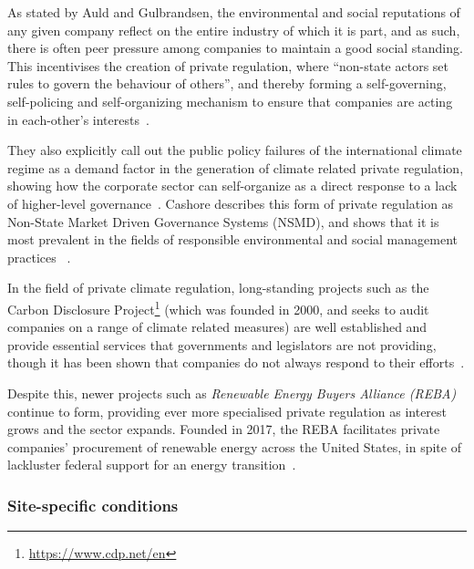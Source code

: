 As stated by Auld and Gulbrandsen, the environmental and social
reputations of any given company reflect on the entire industry of
which it is part, and as such, there is often peer pressure among
companies to maintain a good social standing. This incentivises the
creation of private regulation, where ``non-state actors set rules to
govern the behaviour of others'', and thereby forming a
self-governing, self-policing and self-organizing mechanism to ensure
that companies are acting in each-other's
interests~\citep{auld2013private}.

They also explicitly call out the public policy failures of the
international climate regime as a demand factor in the generation of
climate related private regulation, showing how the corporate sector
can self-organize as a direct response to a lack of higher-level
governance~\citep[p.403]{auld2013private}. Cashore describes this form
of private regulation as Non-State Market Driven Governance Systems
(NSMD), and shows that it is most prevalent in the fields of
responsible environmental and social management practices
~\citep{cashore2002legitimacy}.


In the field of private climate regulation, long-standing projects
such as the Carbon Disclosure
Project\footnote{\url{https://www.cdp.net/en}} (which was founded in
2000, and seeks to audit companies on a range of climate related
measures) are well established and provide essential services that
governments and legislators are not providing, though it has been
shown that companies do not always respond to their
efforts~\citep{matisoff2013convergence}.

Despite this, newer projects such as \textit{Renewable Energy Buyers
  Alliance (REBA)} continue to form, providing ever more specialised
private regulation as interest grows and the sector expands. Founded
in 2017, the REBA facilitates private companies' procurement of
renewable energy across the United States, in spite of lackluster
federal support for an energy transition~\citep{reba2020}.

\subsubsection{Site-specific conditions}


